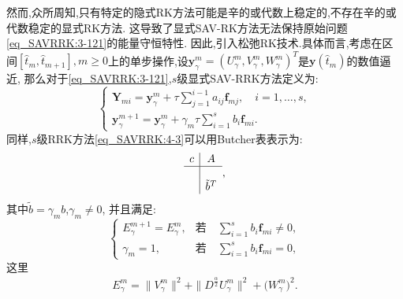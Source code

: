 然而,众所周知,只有特定的隐式RK方法可能是辛的或代数上稳定的,不存在辛的或代数稳定的显式RK方法.
这导致了显式SAV-RK方法无法保持原始问题\eqref{eq_SAVRRK:3-121}的能量守恒特性.
因此,引入松弛RK技术.具体而言,考虑在区间$\left[\hat{t}_m, \hat{t}_{m+1}\right], m \geq 0$上的单步操作,设$\bm{y}_\gamma^m=\left(U^{m}_{\gamma},V^{m}_{\gamma},W^{m}_{\gamma}\right)^T$是$\bm{y}\left(\hat{t}_m\right)$的数值逼近,
那么对于\eqref{eq_SAVRRK:3-121},$s$级显式SAV-RRK方法定义为:
\begin{equation}
\left\{\begin{array}{l}
\bm{Y}_{m i}=\bm{y}_\gamma^m+\tau \sum\limits_{j=1}^{i-1} a_{i j} \bm{f}_{m j}, \quad i=1, \ldots, s, \\
\bm{y}_\gamma^{m+1}=\bm{y}_\gamma^m+\gamma_m \tau \sum\limits_{i=1}^s b_i \bm{f}_{m i}.
\end{array}\right.\label{eq_SAVRRK:4-3}
\end{equation}
同样,$s$级RRK方法\eqref{eq_SAVRRK:4-3}可以用Butcher表表示为:
\begin{equation}
\begin{array}{c|c}
c & A \\
\hline \\
& \tilde{b}^T
\end{array},
\end{equation}
其中$\tilde{b}=\gamma_m b$,$\gamma_m\neq 0$, 并且满足:
\begin{equation}
\left\{\begin{array}{ll}
E_{\gamma}^{m+1}=E_{\gamma}^{m}, & \text{若} \quad  \sum\limits_{i=1}^s b_i \bm{f}_{m i} \neq 0,\\
\gamma_m=1, & \text{若} \quad  \sum\limits_{i=1}^s b_i \bm{f}_{m i} =0,
\end{array}\right.\label{eq_SAVRRK:4-6}
\end{equation}
这里
\begin{align}\label{eq_SAVRRK:4-6b}
E_{\gamma}^{m}  =\|V_{\gamma}^{m}\|^2+\|D^\frac{\alpha}{2} U_{\gamma}^{m}\|^2+\big(W_{\gamma}^{m}\big)^2.
\end{align}

